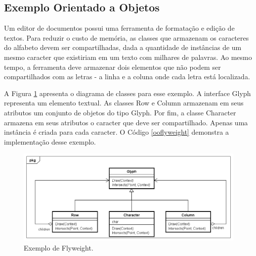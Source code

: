 \subsection*{Exemplo Orientado a Objetos}

Um editor de documentos possui uma ferramenta 
de formatação e edição de textos. Para reduzir o 
custo de memória, as classes que armazenam os 
caracteres do alfabeto devem ser compartilhadas, 
dada a quantidade de instâncias de um mesmo caracter 
que existiriam em um texto com milhares de palavras. 
Ao mesmo tempo, a ferramenta deve armazenar dois 
elementos que não podem ser compartilhados com as 
letras - a linha e a coluna onde cada letra está 
localizada. 

A Figura \ref{flyweight_exemplo} apresenta o diagrama 
de classes para esse exemplo. A interface Glyph 
representa um elemento textual. As classes Row e 
Column armazenam em seus atributos um conjunto de objetos 
do tipo Glyph. 
Por fim, a classe Character armazena em seus atributos 
o caracter que deve ser compartilhado. Apenas uma 
instância é criada para cada caracter. O 
Código \ref{ooflyweight} demonstra a implementação 
desse exemplo.

\begin{figure}[htb]
	\caption{\label{flyweight_exemplo}Exemplo de Flyweight.}
	\begin{center}
	    \includegraphics[scale=0.5]{5_padroes-contexto-funcional/5.2_estruturais/5.2.6_flyweight/flyweight_exemplo.png}
	\end{center}
\end{figure}

